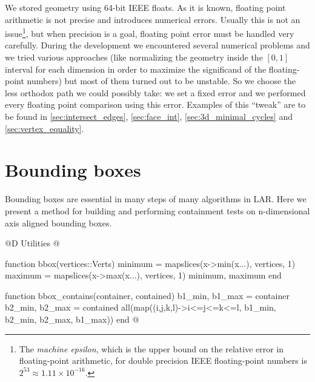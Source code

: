 We stored geometry using 64-bit IEEE floats.
As it is known, floating point arithmetic is not
precise and introduces numerical errors.
Usually this is not an issue\footnote{The \textit{machine epsilon},
which is the upper bound on the relative error in floating-point 
arithmetic, for double precision IEEE floating-point numbers is 
$2^53 \approx 1.11 \times 10^{-16}$.}, but when precision is
a goal, floating point error must be handled very carefully.
During the development we encountered several numerical problems
and we tried various approaches (like normalizing the geometry
inside the $[0, 1]$ interval for each dimension in order to maximize
the significand of the floating-point numbers) but most of them turned 
out to be unstable. So we choose the less orthodox path we could
possibly take: we set a fixed error and we performed every floating point
comparison using this error. Examples of this ``tweak'' are to be found in
\ref{sec:intersect_edges}, \ref{sec:face_int}, \ref{sec:3d_minimal_cycles} and 
\ref{sec:vertex_equality}.


\section{Bounding boxes}
\label{sec:bboxes}

Bounding boxes are essential in many steps of many
algorithms in LAR. Here we present a method for building
and performing containment tests on n-dimensional 
axis aligned bounding boxes.

@D Utilities
@{function bbox(vertices::Verts)
    minimum = mapslices(x->min(x...), vertices, 1)
    maximum = mapslices(x->max(x...), vertices, 1)
    minimum, maximum
end

function bbox_contains(container, contained)
    b1_min, b1_max = container
    b2_min, b2_max = contained
    all(map((i,j,k,l)->i<=j<=k<=l, b1_min, b2_min, b2_max, b1_max))
end
@}

